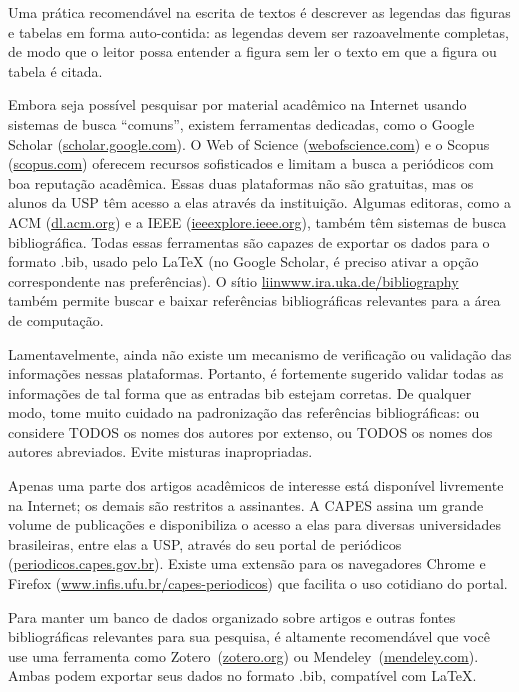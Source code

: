 Uma prática recomendável na escrita de textos é descrever as
legendas das figuras e tabelas em forma auto-contida: as
legendas devem ser razoavelmente completas, de modo que o leitor possa entender
a figura sem ler o texto em que a figura ou tabela é citada.


Embora seja possível pesquisar por material acadêmico na Internet usando
sistemas de busca ``comuns'', existem ferramentas dedicadas, como o
\textsf{Google Scholar} (\url{scholar.google.com}).
O \textsf{Web of Science}
(\url{webofscience.com}) e o \textsf{Scopus} (\url{scopus.com})
oferecem recursos sofisticados e limitam a busca a periódicos com boa
reputação acadêmica. Essas duas plataformas não são gratuitas, mas os alunos
da USP têm acesso a elas através da instituição. Algumas editoras, como a
ACM (\url{dl.acm.org}) e a IEEE (\url{ieeexplore.ieee.org}), também têm
sistemas de busca bibliográfica. Todas essas ferramentas são capazes de
exportar os dados para o formato .bib, usado pelo \LaTeX{} (no Google
Scholar, é preciso ativar a opção correspondente nas preferências). O sítio
\url{liinwww.ira.uka.de/bibliography} também permite buscar e baixar
referências bibliográficas relevantes para a área de computação.

Lamentavelmente, ainda não existe um mecanismo de verificação ou validação
das informações nessas plataformas. Portanto, é fortemente sugerido validar
todas as informações de tal forma que as entradas bib estejam corretas.
De qualquer modo, tome muito cuidado na padronização das referências
bibliográficas: ou considere TODOS os nomes dos autores por extenso, ou
TODOS os nomes dos autores abreviados. Evite misturas inapropriadas.

Apenas uma parte dos artigos acadêmicos de interesse está disponível livremente
na Internet; os demais são restritos a assinantes. A CAPES assina um grande
volume de publicações e disponibiliza o acesso a elas para diversas universidades
brasileiras, entre elas a USP, através do seu portal de periódicos
(\url{periodicos.capes.gov.br}). Existe uma extensão para os navegadores
Chrome e Firefox (\url{www.infis.ufu.br/capes-periodicos}) que facilita o uso
cotidiano do portal.

Para manter um banco de dados organizado sobre artigos e outras fontes bibliográficas
relevantes para sua pesquisa, é altamente recomendável que você use uma ferramenta
como Zotero~(\url{zotero.org}) ou
Mendeley~(\url{mendeley.com}). Ambas podem exportar seus dados no
formato .bib, compatível com \LaTeX{}.
